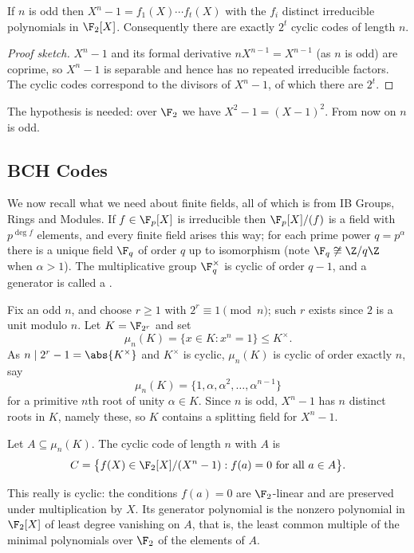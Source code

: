 \begin{lemma}\label{lem:squarefree}
	If $n$ is odd then $X^n-1 = f_1(X)\cdots f_t(X)$ with the $f_i$ distinct irreducible polynomials in $\F_2[X]$. Consequently there are exactly $2^t$ cyclic codes of length $n$.
\end{lemma}

\begin{proof}[Proof sketch]
	$X^n-1$ and its formal derivative $nX^{n-1} = X^{n-1}$ (as $n$ is odd) are coprime, so $X^n-1$ is separable and hence has no repeated irreducible factors. The cyclic codes correspond to the divisors of $X^n-1$, of which there are $2^t$.
\end{proof}

The hypothesis is needed: over $\F_2$ we have $X^2-1 = (X-1)^2$. From now on $n$ is odd.

\subsection{BCH Codes}

We now recall what we need about finite fields, all of which is from IB Groups, Rings and Modules. If $f \in \F_p[X]$ is irreducible then $\F_p[X]/(f)$ is a field with $p^{\deg f}$ elements, and every finite field arises this way; for each prime power $q = p^\alpha$ there is a unique field $\F_q$ of order $q$ up to isomorphism (note $\F_q \not\cong \Z/q\Z$ when $\alpha>1$). The multiplicative group $\F_q^\times$ is cyclic of order $q-1$, and a generator is called a .

Fix an odd $n$, and choose $r \ge 1$ with $2^r \equiv 1 \pmod n$; such $r$ exists since $2$ is a unit modulo $n$. Let $K = \F_{2^r}$ and set
$$\mu_n(K) = \{x \in K : x^n = 1\} \le K^\times.$$
As $n \mid 2^r-1 = \abs{K^\times}$ and $K^\times$ is cyclic, $\mu_n(K)$ is cyclic of order exactly $n$, say
$$\mu_n(K) = \{1,\alpha,\alpha^2,\dots,\alpha^{n-1}\}$$
for a primitive $n$th root of unity $\alpha \in K$. Since $n$ is odd, $X^n-1$ has $n$ distinct roots in $K$, namely these, so $K$ contains a splitting field for $X^n-1$.

\begin{definition}
	Let $A \subseteq \mu_n(K)$. The cyclic code of length $n$ with  $A$ is
	$$C = \bigl\{f(X) \in \F_2[X]/(X^n-1) : f(a) = 0 \text{ for all } a \in A\bigr\}.$$
\end{definition}

This really is cyclic: the conditions $f(a)=0$ are $\F_2$-linear and are preserved under multiplication by $X$. Its generator polynomial is the nonzero polynomial in $\F_2[X]$ of least degree vanishing on $A$, that is, the least common multiple of the minimal polynomials over $\F_2$ of the elements of $A$.

